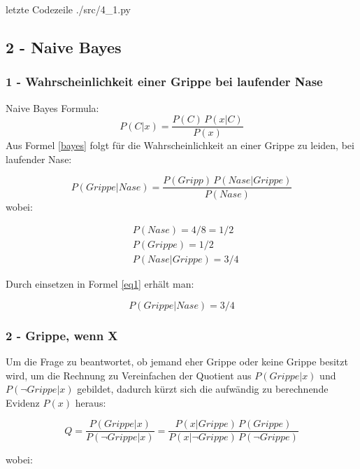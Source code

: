  letzte Codezeile
{./src/4_1.py}

\subsection*{2 - Naive Bayes}
\subsubsection*{1 - Wahrscheinlichkeit einer Grippe bei laufender Nase}
Naive Bayes Formula:
\begin{equation}
P(C|x) = \frac{P(C)\, P(x|C)}{P(x)}
\label{bayes}
\end{equation}
Aus Formel \ref{bayes} folgt für die Wahrscheinlichkeit an einer Grippe zu leiden, bei laufender Nase:

\begin{equation}
P(Grippe|Nase) = \frac{P(Gripp)\, P(Nase|Grippe)}{P(Nase)}
\label{eq1}
\end{equation}
wobei:

\begin{align*}
&P(Nase) = 4/8 = 1/2 \\
&P(Grippe) = 1/2 \\
&P(Nase|Grippe) = 3/4
\end{align*}

Durch einsetzen in Formel \ref{eq1} erhält man:

\begin{equation*}
P(Grippe|Nase) = 3/4
\end{equation*}

\subsubsection*{2 - Grippe, wenn X}
Um die Frage zu beantwortet, ob jemand eher Grippe oder keine Grippe besitzt wird, um die Rechnung zu Vereinfachen der Quotient aus $P(Grippe|x)$ und $P(\neg Grippe|x)$ gebildet, dadurch kürzt sich die aufwändig zu berechnende Evidenz $P(x)$ heraus:

\begin{equation}
Q = \frac{P(Grippe|x)}{P(\neg Grippe|x)} = \frac{P(x|Grippe) \, P(Grippe)}{P(x|\neg Grippe) \, P(\neg Grippe)}
\end{equation}

wobei:

